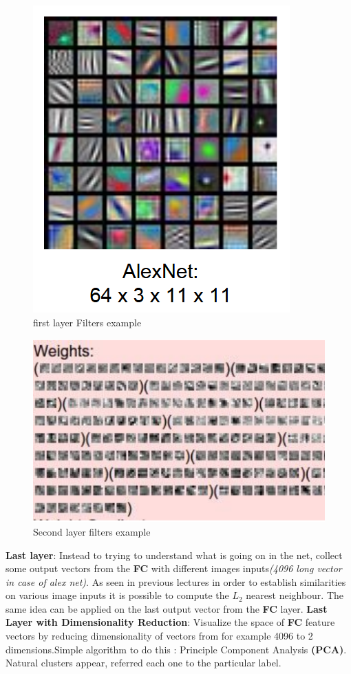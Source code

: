 \documentclass[11pt]{article}
\begin{document}
\begin{minipage}{0.5\textwidth}
\begin{figure} [H]
\centering 
\includegraphics[scale=0.6]{L1110.pdf}
\caption{ first layer Filters example }
\label{fig:L1110}
\end{figure}
\end{minipage}
\begin{minipage}{0.5\textwidth}
\begin{figure} [H]
\centering 
\includegraphics[scale=0.6]{L1111.pdf}
\caption{ Second layer filters example}
\label{fig:L1111}
\end{figure}
\end{minipage}
\textbf{Last layer}: Instead to trying to understand what is going on in the net, collect some output vectors from the \textbf{FC} with different images inputs\textit{(4096 long vector in case of alex net)}. As seen in previous lectures in order to establish similarities on various image inputs it is possible to compute the $L_2$ nearest neighbour. The same idea can be applied on the last output vector from the \textbf{FC} layer.
\textbf{Last Layer with Dimensionality Reduction}: Visualize the space of \textbf{FC} feature vectors by reducing dimensionality of vectors from for example 4096 to 2 dimensions.Simple algorithm to do this : Principle Component Analysis \textbf{(PCA)}. Natural clusters appear, referred each one to the particular label.
\end{document}
